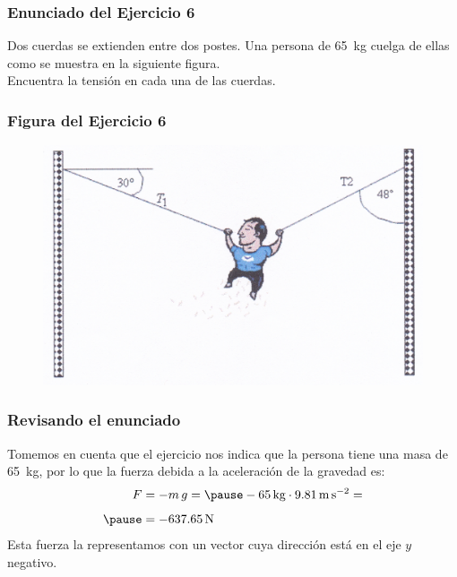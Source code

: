 \documentclass[12pt]{beamer}
\begin{document}
\begin{frame}
\frametitle{Enunciado del Ejercicio 6}
Dos cuerdas se extienden entre dos postes. Una persona de \SI{65}{\kilo\gram} cuelga de ellas como se muestra en la siguiente figura.
\\
\bigskip
\pause
Encuentra la tensión en cada una de las cuerdas.
\end{frame}
\begin{frame}
\frametitle{Figura del Ejercicio 6}
\begin{figure}
  \centering
  \includegraphics[scale=1]{Imagenes/DCL_Problema_06.png}
\end{figure}
\end{frame}
\begin{frame}
\frametitle{Revisando el enunciado}
Tomemos en cuenta que el ejercicio nos indica que la persona tiene una masa de \SI{65}{\kilo\gram}, por lo que la fuerza debida a la aceleración de la gravedad es:
\pause
\begin{eqnarray*}
\begin{aligned}
F &= - m \, g = \pause - \SI{65}{\kilogram} \cdot \SI{9.81}{\meter\per\square\second} = \\[0.5em] \pause
&= - \SI{637.65}{\newton}
\end{aligned}
\end{eqnarray*}
\pause
Esta fuerza la representamos con un vector cuya dirección está en el eje $y$ negativo.
\end{frame}
\end{document}
